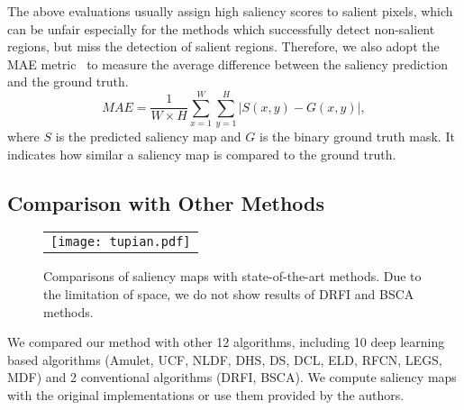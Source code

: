 \documentclass[journal]{IEEEtran}
\begin{document}
The above evaluations usually assign high saliency scores to salient pixels, which can be unfair especially for the methods which successfully detect non-salient regions, but miss the detection of salient regions.
%
Therefore, we also adopt the MAE metric~\cite{Borji2015Salient} to measure the average difference between the saliency prediction and the ground truth.
\begin{equation}
MAE =\frac{1}{W\times H}\sum_{x=1}^{W}\sum_{y=1}^{H}|S(x,y) - G(x,y)|,
\end{equation}
where $S$ is the predicted saliency map and $G$ is the binary ground truth mask.
%
It indicates how similar a saliency map is compared to the ground truth.
\vspace{-2mm}
\subsection{Comparison with Other Methods}
\begin{figure*}[!t]
\begin{center}
\begin{tabular}{@{}c}
\texttt{[image: tupian.pdf]}
\end{tabular}
{\caption{Comparisons of saliency maps with state-of-the-art methods. Due to the limitation of space, we do not show results of DRFI and BSCA methods.}
\label{Fig saliency}}
\vspace{-6mm}
\end{center}
\end{figure*}
We compared our method with other 12 algorithms, including 10 deep learning based algorithms
%
(Amulet\cite{Zhang2017Amulet}, UCF\cite{Zhang2017Learning}, NLDF\cite{Luo2017Non}, DHS\cite{Liu2016DHSNet}, DS\cite{Li2015DeepSaliency}, DCL\cite{Li2016Deep}, ELD\cite{Lee2016Deep}, RFCN\cite{Wang2016Saliency}, LEGS\cite{Wang2015Deep}, MDF\cite{Li2015Visual}) and 2 conventional  algorithms (DRFI\cite{Jiang2013Salient}, BSCA\cite{Qin2015Saliency}).
%
We compute saliency maps with the original implementations or use them provided by the authors.
\end{document}
